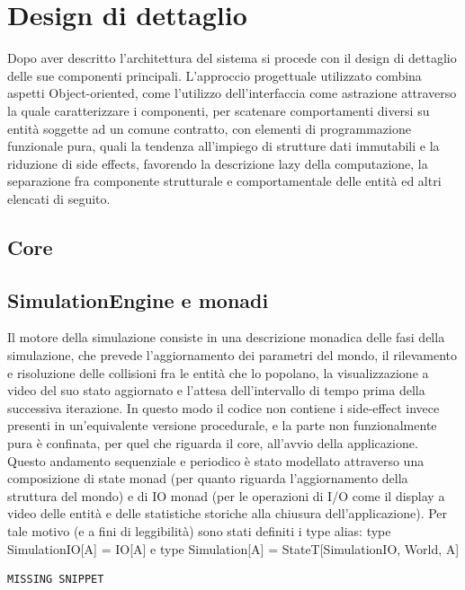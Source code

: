 \chapter{Design di dettaglio}

Dopo aver descritto l’architettura del sistema si procede con il design di dettaglio delle sue componenti principali. 
L’approccio progettuale utilizzato combina aspetti Object-oriented, come l’utilizzo dell’interfaccia come astrazione attraverso la quale caratterizzare i componenti, per scatenare comportamenti diversi su entità soggette ad un comune contratto, con elementi di programmazione funzionale pura, quali la tendenza all’impiego di strutture dati immutabili e la riduzione di side effects, favorendo la descrizione lazy della computazione, la separazione fra componente strutturale e comportamentale delle entità ed altri elencati di seguito.


\section{Core}

\section{SimulationEngine e monadi}
Il motore della simulazione  consiste in una descrizione monadica delle fasi della simulazione, che prevede l’aggiornamento dei parametri del mondo, il rilevamento e risoluzione delle collisioni fra le entità che lo popolano, la visualizzazione a video del suo stato aggiornato e l’attesa dell’intervallo di tempo prima della successiva iterazione. In questo modo il codice non contiene i side-effect invece presenti in un’equivalente versione procedurale, e la parte non funzionalmente pura è confinata, per quel che riguarda il core, all’avvio della applicazione. 
Questo andamento sequenziale e periodico è stato modellato attraverso una composizione di state monad  (per quanto riguarda l’aggiornamento della struttura del mondo) e di IO monad (per le operazioni di I/O come il display a video delle entità e delle statistiche storiche alla chiusura dell’applicazione). Per tale motivo (e a fini di leggibilità) sono stati definiti i type alias: type SimulationIO[A] = IO[A] e type Simulation[A] = StateT[SimulationIO, World, A]


\begin{verbatim}
MISSING SNIPPET
\end{verbatim}

